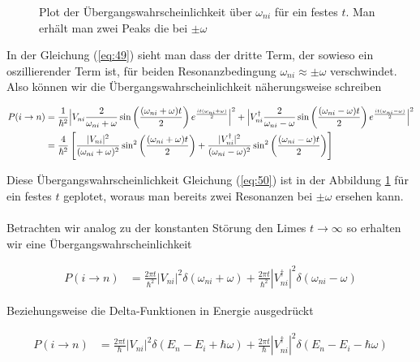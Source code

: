 \begin{figure}[!thb]
  \centering
  
  \caption{Plot der Übergangswahrscheinlichkeit über \(\omega_{ni}\)  für ein festes \(t\). Man erhält man zwei Peaks die bei \(\pm \omega\)}
 \label{fig:2}
\end{figure}

In der Gleichung (\ref{eq:49}) sieht man dass der dritte Term, der sowieso ein oszillierender Term ist, für beiden Resonanzbedingung \(\omega_{ni}\approx \pm \omega\) verschwindet. Also können wir die Übergangswahrscheinlichkeit näherungsweise schreiben


\begin{align}
  \label{eq:50}
   P(i\rightarrow n) &=  \frac{1}{\hbar^2}  \Big|V_{ni} \frac{2}{\omega_{ni}+\omega}\sin\left(\frac{(\omega_{ni}+\omega) t}{2}\right)e^{\frac{it(\omega_{ni}+\omega)}{2}}\Big|^2 +  \Big|V^\dagger_{ni} \frac{2}{\omega_{ni}-\omega}\sin\left(\frac{(\omega_{ni}-\omega) t}{2}\right)e^{\frac{it(\omega_{ni}-\omega)}{2} }\Big|^2 \notag\\
&=  \frac{4}{\hbar^2} \left[  \frac{|V_{ni}|^2}{(\omega_{ni}+\omega)^2}\sin^2\left(\frac{(\omega_{ni}+\omega) t}{2}\right)  +   \frac{|V^\dagger_{ni}|^2}{(\omega_{ni}-\omega)^2}\sin^2\left(\frac{(\omega_{ni}-\omega) t}{2}\right) \right]
\end{align}

Diese Übergangswahrscheinlichkeit Gleichung (\ref{eq:50}) ist in der Abbildung \ref{fig:2} für ein festes \(t\) geplotet, woraus man bereits zwei Resonanzen bei \(\pm\omega\) ersehen kann.\\
\\
Betrachten wir analog zu der konstanten Störung den Limes \(t\to\infty\) so erhalten wir eine Übergangswahrscheinlichkeit

\begin{align}
  \label{eq:51}
   P(i\rightarrow n) &= \frac{2\pi t}{\hbar^2}|V_{ni}|^2 \delta(\omega_{ni}+\omega) + \frac{2\pi t}{\hbar^2}|V_{ni}^\dagger|^2 \delta(\omega_{ni}-\omega)
\end{align}

Beziehungsweise die Delta-Funktionen in Energie ausgedrückt

\begin{align}
  \label{eq:52}
     P(i\rightarrow n) &= \frac{2\pi t}{\hbar}|V_{ni}|^2 \delta(E_n - E_i + \hbar\omega ) + \frac{2\pi t}{\hbar}|V_{ni}^\dagger|^2 \delta(E_n - E_i - \hbar\omega)
\end{align}

